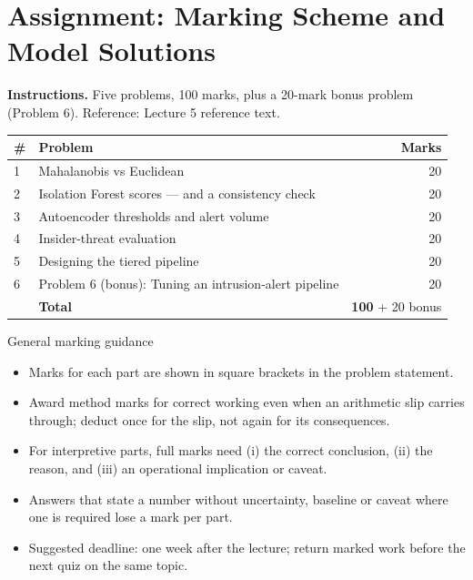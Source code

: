 \documentclass[11pt]{article}
\begin{document}
\section{Assignment: Marking Scheme and Model Solutions}

\textbf{Instructions.} Five problems, 100 marks, plus a 20-mark bonus problem (Problem 6). Reference: Lecture 5 reference text.

\begin{center}\small\renewcommand{\arraystretch}{1.25}\begin{tabularx}{0.85\textwidth}{@{}l X r@{}}\toprule\textbf{\#} & \textbf{Problem} & \textbf{Marks}\\\midrule1 & Mahalanobis vs Euclidean & 20\\
2 & Isolation Forest scores --- and a consistency check & 20\\
3 & Autoencoder thresholds and alert volume & 20\\
4 & Insider-threat evaluation & 20\\
5 & Designing the tiered pipeline & 20\\
6 & Problem 6 (bonus): Tuning an intrusion-alert pipeline & 20\\\midrule & \textbf{Total} & \textbf{100} + 20 bonus\\\bottomrule\end{tabularx}\end{center}

\begin{instr}{General marking guidance}\begin{itemize}
\item Marks for each part are shown in square brackets in the problem statement.
\item Award method marks for correct working even when an arithmetic slip carries through; deduct once for the slip, not again for its consequences.
\item For interpretive parts, full marks need (i) the correct conclusion, (ii) the reason, and (iii) an operational implication or caveat.
\item Answers that state a number without uncertainty, baseline or caveat where one is required lose a mark per part.
\item Suggested deadline: one week after the lecture; return marked work before the next quiz on the same topic.
\end{itemize}\end{instr}
\end{document}
